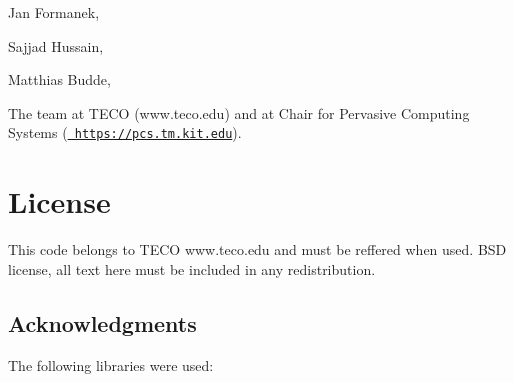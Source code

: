 \begin{DoxyItemize}
\item Jan Formanek,
\item Sajjad Hussain,
\item Matthias Budde,
\end{DoxyItemize}

The team at T\+E\+CO (www.\+teco.\+edu) and at Chair for Pervasive Computing Systems (\href{https://pcs.tm.kit.edu}{\texttt{ https\+://pcs.\+tm.\+kit.\+edu}}).\hypertarget{index_license}{}\section{License}\label{index_license}
This code belongs to T\+E\+CO www.\+teco.\+edu and must be reffered when used. B\+SD license, all text here must be included in any redistribution. \hypertarget{index_ack}{}\subsection{Acknowledgments}\label{index_ack}
The following libraries were used\+:~\newline


